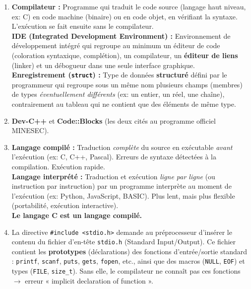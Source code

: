 \documentclass[11pt]{article}
\begin{document}
\begin{corrige}
\begin{enumerate}
  \item \textbf{Compilateur :} Programme qui traduit le code source (langage haut niveau, ex: C) en code machine (binaire) ou en code objet, en vérifiant la syntaxe. L'exécution se fait ensuite sans le compilateur. \\
  \textbf{IDE (Integrated Development Environment) :} Environnement de développement intégré qui regroupe au minimum un éditeur de code (coloration syntaxique, complétion), un compilateur, un \textbf{éditeur de liens} (linker) et un débogueur dans une seule interface graphique. \\
  \textbf{Enregistrement (\texttt{struct}) :} Type de données \textbf{structuré} défini par le programmeur qui regroupe sous un même nom plusieurs champs (membres) de types \emph{éventuellement différents} (ex: un entier, un réel, une chaîne), contrairement au tableau qui ne contient que des éléments de même type.
  \item \textbf{Dev-C++} et \textbf{Code::Blocks} (les deux cités au programme officiel MINESEC).
  \item \textbf{Langage compilé :} Traduction \emph{complète} du source en exécutable \emph{avant} l'exécution (ex: C, C++, Pascal). Erreurs de syntaxe détectées à la compilation. Exécution rapide. \\
  \textbf{Langage interprété :} Traduction et exécution \emph{ligne par ligne} (ou instruction par instruction) par un programme interprète au moment de l'exécution (ex: Python, JavaScript, BASIC). Plus lent, mais plus flexible (portabilité, exécution interactive). \\
  \textbf{Le langage C est un langage compilé.}
  \item La directive \texttt{\#include <stdio.h>} demande au préprocesseur d'insérer le contenu du fichier d'en-tête \texttt{stdio.h} (Standard Input/Output). Ce fichier contient les \textbf{prototypes} (déclarations) des fonctions d'entrée/sortie standard : \texttt{printf}, \texttt{scanf}, \texttt{puts}, \texttt{gets}, \texttt{fopen}, etc., ainsi que des macros (\texttt{NULL}, \texttt{EOF}) et types (\texttt{FILE}, \texttt{size\_t}). Sans elle, le compilateur ne connaît pas ces fonctions $\rightarrow$ erreur « implicit declaration of function ».
\end{enumerate}
\end{corrige}
\end{document}
